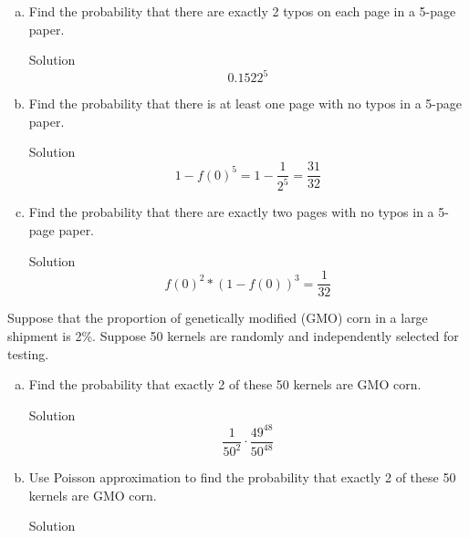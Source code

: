 \documentclass{article}
\begin{document}
\begin{spacing}{1.1}
\begin{homeworkProblem}
\begin{enumerate}[(a)]
\begin{homeworkSection}{Solution}
			\end{homeworkSection}
		\item Find the probability that there are exactly 2 typos on each page in a 5-page paper.
			\begin{homeworkSection}{Solution}
				\[0.1522^5\]
			\end{homeworkSection}
		\item Find the probability that there is at least one page with no typos in a 5-page paper.
			\begin{homeworkSection}{Solution}
				\[1 - f(0)^5 = 1 - \frac{1}{{{2^5}}} = \frac{{31}}{{32}}\]
			\end{homeworkSection}
		\item Find the probability that there are exactly two pages with no typos in a 5-page paper.
			\begin{homeworkSection}{Solution}
				\[f(0)^2*(1 - f(0))^3 = \frac{1}{{32}}\]
			\end{homeworkSection}
	\end{enumerate}
\end{homeworkProblem}
\begin{homeworkProblem}
	Suppose that the proportion of genetically modified (GMO) corn in a large shipment is 2\%. Suppose 50 kernels are randomly and independently selected for testing.
	\begin{enumerate}[(a)]
		\item Find the probability that exactly 2 of these 50 kernels are GMO corn.
			\begin{homeworkSection}{Solution}
				\[\frac{1}{{{{50}^2}}} \cdot \frac{{{{49}^{48}}}}{{{{50}^{48}}}}\]
			\end{homeworkSection}
		\item Use Poisson approximation to find the probability that exactly 2 of these 50 kernels are GMO corn.
			\begin{homeworkSection}{Solution}
		

\end{homeworkSection}
\end{enumerate}
\end{homeworkProblem}
\end{spacing}
\end{document}
